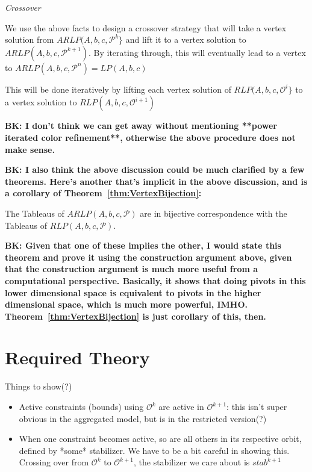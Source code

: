 \documentclass[runningheads]{llncs}
\newcommand{\cP}{{\mathcal P}}
\newcommand{\cO}{{\mathcal O}}
\begin{document}
{\em Crossover}

We use the above facts to design a crossover strategy that will take a vertex
solution from $ARLP(A,b,c,\cP^k\}$ and  lift it to a vertex solution to
$ARLP(A,b,c,\cP^{k+1})$. By iterating through, this will eventually lead to a vertex to $ARLP(A,b,c,\cP^{n}) = LP(A,b,c)$







This will be done iteratively by lifting each
vertex solution of  $RLP(A,b,c,\cO^i\}$  to a vertex solution to
$RLP(A,b,c,\cO^{i+1})$ 

{\bf BK: I don't think we can get away without mentioning **power iterated color refinement**, otherwise the above procedure does not make sense.}

{\bf BK: I also think the above discussion could be much clarified by a few theorems. Here's another that's implicit in the above discussion, and is a corollary of Theorem~\ref{thm:VertexBijection}:}

\begin{theorem}
	The Tableaus of $ARLP(A,b,c,\cP)$ are in bijective correspondence with the Tableaus of $RLP(A,b,c,\cP)$.  
\end{theorem}

{\bf BK: Given that one of these implies the other, I would state this theorem and prove it using the construction argument above, given that the construction argument is much more useful from a computational perspective.
Basically, it shows that doing pivots in this lower dimensional space is equivalent to pivots in the higher dimensional space, which is much more powerful, IMHO. Theorem~\ref{thm:VertexBijection} is just corollary of this, then.}


\section{Required Theory}

Things to show(?)
\begin{itemize}
\item Active constraints (bounds) using $\cO^k$ are active in $\cO^{k+1}$: this isn't
  super obvious in the aggregated model, but is in the restricted version(?)
  \item When one constraint becomes active, so are all others in its respective
    orbit, defined by *some* stabilizer. We have to be a bit careful in showing
    this. Crossing over  from $\cO^k$ to $\cO^{k+1}$, the stabilizer we care
    about is $stab^{k+1}$

    \end{itemize}
\end{document}
